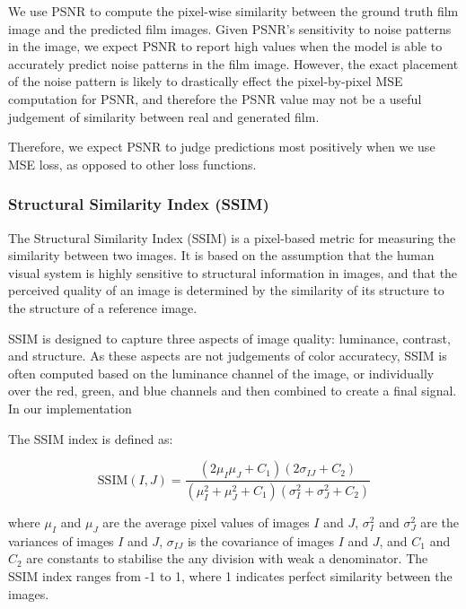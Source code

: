 We use PSNR to compute the pixel-wise similarity between the ground truth film image and the predicted film images. Given PSNR's sensitivity to noise patterns in the image, we expect PSNR to report high values when the model is able to accurately predict noise patterns in the film image. However, the exact placement of the noise pattern is likely to drastically effect the pixel-by-pixel MSE computation for PSNR, and therefore the PSNR value may not be a useful judgement of similarity between real and generated film.

Therefore, we expect PSNR to judge predictions most positively when we use MSE loss, as opposed to other loss functions.


\subsubsection{Structural Similarity Index (SSIM)}

The Structural Similarity Index (SSIM) is a pixel-based metric for measuring the similarity between two images. It is based on the assumption that the human visual system is highly sensitive to structural information in images, and that the perceived quality of an image is determined by the similarity of its structure to the structure of a reference image.

SSIM is designed to capture three aspects of image quality: luminance, contrast, and structure. As these aspects are not judgements of color accuratecy, SSIM is often computed based on the luminance channel of the image, or individually over the red, green, and blue channels and then combined to create a final signal. In our implementation

The SSIM index is defined as:

\begin{equation}
    \text{SSIM}(I, J) = \frac{(2\mu_I\mu_J + C_1)(2\sigma_{IJ} + C_2)}{(\mu_I^2 + \mu_J^2 + C_1)(\sigma_I^2 + \sigma_J^2 + C_2)}
    \label{eq:ssim}
\end{equation}

where $\mu_I$ and $\mu_J$ are the average pixel values of images $I$ and $J$, $\sigma_I^2$ and $\sigma_J^2$ are the variances of images $I$ and $J$, $\sigma_{IJ}$ is the covariance of images $I$ and $J$, and $C_1$ and $C_2$ are constants to stabilise the any division with weak a denominator. The SSIM index ranges from -1 to 1, where 1 indicates perfect similarity between the images.

